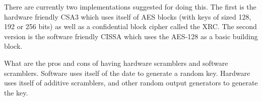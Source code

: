 There are currently two implementations suggested for doing this. The first is 
the hardware friendly CSA3 which uses itself of AES blocks (with keys of sized 
128, 192 or 256 bits) as well as a confidential block cipher called the XRC. The 
second version is the software friendly CISSA which uses the AES-128 as a basic 
building block. \citep{DVB:2013}

What are the pros and cons of having hardware scramblers and software scramblers.
Software uses itself of the date to generate a random key. Hardware uses itself 
of additive scramblers, and other random output generators to generate the key. 
